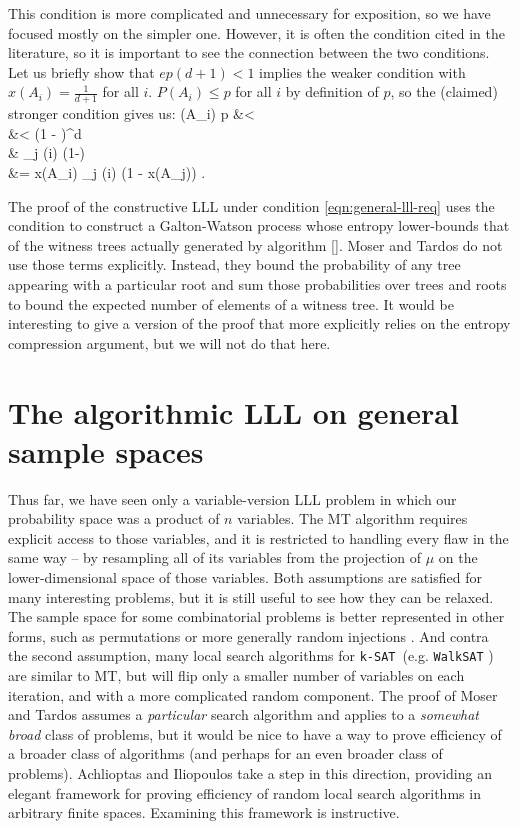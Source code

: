 \documentclass[twocolumn]{article}
\newcommand{\ksat}{\texttt{k-SAT}~}
\def\seqn#1\eeqn{\begin{align}#1\end{align}}
\begin{document}
This condition is more complicated and unnecessary for exposition, so we have  focused mostly on the simpler one.  However, it is often the condition cited in the literature, so it is important to see the connection between the two conditions.  Let us briefly show that $e p (d+1) < 1$ implies the weaker condition with $x(A_i) = \frac{1}{d+1}$ for all $i$.  $P(A_i) \leq p$ for all $i$ by definition of $p$, so the (claimed) stronger condition gives us:
\seqn
  P(A_i) \leq p &<    \\
  &<  (1 - )^d \\
  &\leq {} \prod_{j \in \Gamma(i)} (1-) \\
  &= x(A_i) \prod_{j \in \Gamma(i)} (1 - x(A_j)) .
\eeqn

The proof of the constructive LLL under condition \ref{eqn:general-lll-req} uses the condition to construct a Galton-Watson process whose entropy lower-bounds that of the witness trees actually generated by algorithm \ref{}.  Moser and Tardos do not use those terms explicitly.  Instead, they bound the probability of any tree appearing with a particular root and sum those probabilities over trees and roots to bound the expected number of elements of a witness tree.  It would be interesting to give a version of the proof that more explicitly relies on the entropy compression argument, but we will not do that here.

\section{The algorithmic LLL on general sample spaces}
\label{sec:perfect}
Thus far, we have seen only a variable-version LLL problem in which our probability space was a product of $n$ variables.  The MT algorithm requires explicit access to those variables, and it is restricted to handling every flaw in the same way -- by resampling all of its variables from the projection of $\mu$ on the lower-dimensional space of those variables.  Both assumptions are satisfied for many interesting problems, but it is still useful to see how they can be relaxed.  The sample space for some combinatorial problems is better represented in other forms, such as permutations \cite{achlioptas2014random} or more generally random injections \cite{lu2007injections}.  And contra the second assumption, many local search algorithms for \ksat (e.g. \texttt{WalkSAT} \cite{papadimitriou1991selecting}) are similar to MT, but will flip only a smaller number of variables on each iteration, and with a more complicated random component.
The proof of Moser and Tardos assumes a \emph{particular} search algorithm and applies to a \emph{somewhat broad} class of problems, but it would be nice to have a way to prove efficiency of a broader class of algorithms (and perhaps for an even broader class of problems).  Achlioptas and Iliopoulos \cite{achlioptas2014random} take a step in this direction, providing an elegant framework for proving efficiency of random local search algorithms in arbitrary finite spaces.  Examining this framework is instructive.
\end{document}

